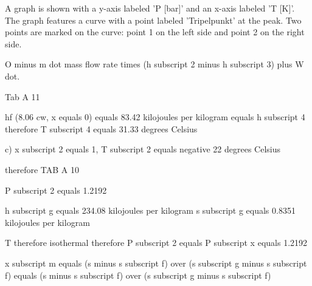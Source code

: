 A graph is shown with a y-axis labeled 'P [bar]' and an x-axis labeled 'T [K]'. The graph features a curve with a point labeled 'Tripelpunkt' at the peak. Two points are marked on the curve: point 1 on the left side and point 2 on the right side.

O minus m dot mass flow rate times (h subscript 2 minus h subscript 3) plus W dot.

Tab A 11

hf (8.06 cw, x equals 0) equals 83.42 kilojoules per kilogram equals h subscript 4
therefore T subscript 4 equals 31.33 degrees Celsius

c) x subscript 2 equals 1, T subscript 2 equals negative 22 degrees Celsius

therefore TAB A 10

P subscript 2 equals 1.2192

h subscript g equals 234.08 kilojoules per kilogram
s subscript g equals 0.8351 kilojoules per kilogram

T therefore isothermal therefore P subscript 2 equals P subscript x equals 1.2192

x subscript m equals (s minus s subscript f) over (s subscript g minus s subscript f) equals (s minus s subscript f) over (s subscript g minus s subscript f)
